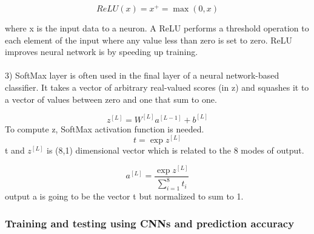 \begin{equation}
ReLU(x) = x^{+} = \max(0,x) 
\end{equation}

where x is the input data to a neuron. A ReLU performs a threshold operation
to each element of the input where any value less than zero is set to zero. ReLU improves neural network is by speeding up training.
\\
\\
3) SoftMax layer \cite{Ref26} is often used in the final layer of a neural network-based classifier.  It takes a vector of arbitrary real-valued scores (in z) and squashes it to a vector of values between zero and one that sum to one.

\begin{equation}
z^{[L]}=W^{[L]}a^{[L-1]}+b^{[L]} 
\end{equation}
To compute z, SoftMax activation function is needed.
\begin{equation}
t = \exp z^{[L]}
\end{equation}
t and $z^{[L]}$ is (8,1) dimensional vector which is related to the 8 modes of output.

\begin{equation}
a^{[L]} = \frac{\exp z^{[L]}}{\sum_{i=1}^{8} t_i} 
\end{equation}
output a is going to be the vector t but normalized to sum to 1.



\subsubsection{Training and testing using CNNs and prediction accuracy}
\label{subsubsec3}

